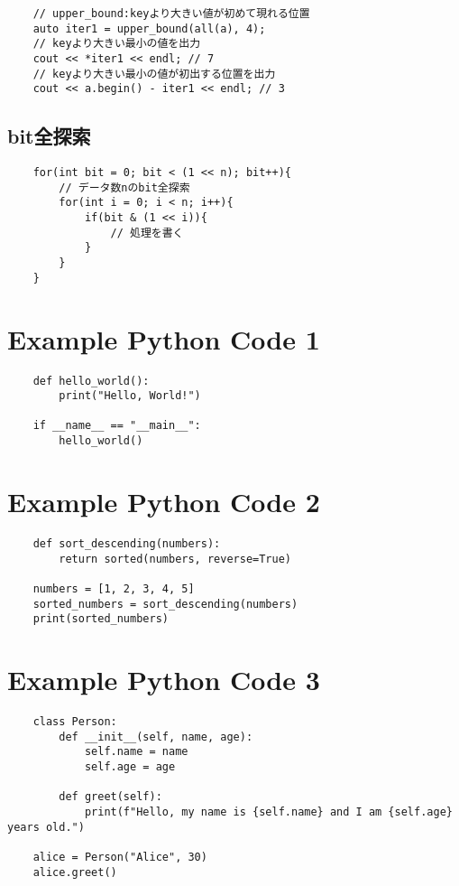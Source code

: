 \documentclass[a4paper, landscape, 9pt]{jarticle} %
\begin{document}
\begin{multicols*}{3}
\begin{lstlisting}
    // upper_bound:keyより大きい値が初めて現れる位置
    auto iter1 = upper_bound(all(a), 4);
    // keyより大きい最小の値を出力
    cout << *iter1 << endl; // 7
    // keyより大きい最小の値が初出する位置を出力
    cout << a.begin() - iter1 << endl; // 3

    \end{lstlisting}

    \subsection{bit全探索}
    \begin{lstlisting}
    for(int bit = 0; bit < (1 << n); bit++){
        // データ数nのbit全探索
        for(int i = 0; i < n; i++){
            if(bit & (1 << i)){
                // 処理を書く
            }
        }
    }
    \end{lstlisting}



    \lstset{style=python}

    \section*{Example Python Code 1}
    \begin{lstlisting}
    def hello_world():
        print("Hello, World!")

    if __name__ == "__main__":
        hello_world()
    \end{lstlisting}

    \section*{Example Python Code 2}
    \begin{lstlisting}
    def sort_descending(numbers):
        return sorted(numbers, reverse=True)

    numbers = [1, 2, 3, 4, 5]
    sorted_numbers = sort_descending(numbers)
    print(sorted_numbers)
    \end{lstlisting}

    \section*{Example Python Code 3}
    \begin{lstlisting}
    class Person:
        def __init__(self, name, age):
            self.name = name
            self.age = age

        def greet(self):
            print(f"Hello, my name is {self.name} and I am {self.age} years old.")

    alice = Person("Alice", 30)
    alice.greet()
    \end{lstlisting}



    

\end{multicols*}
\end{document}
